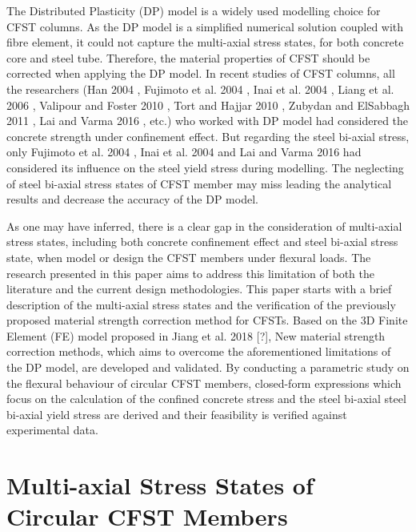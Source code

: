 \documentclass[12pt,a4]{article}
\begin{document}
	\par
	The Distributed Plasticity (DP) model is a widely used modelling choice for CFST columns. As the DP model is a simplified numerical solution coupled with fibre element, it could not capture the multi-axial stress states, for both concrete core and steel tube. Therefore, the material properties of CFST should be corrected when applying the DP model. In recent studies of CFST columns, all the researchers (Han 2004 \cite{RN21}, Fujimoto et al. 2004 \cite{RN15}, Inai et al. 2004 \cite{RN30}, Liang et al. 2006 \cite{RN34}, Valipour and Foster 2010 \cite{RN50}, Tort and Hajjar 2010 \cite{RN46}, Zubydan and ElSabbagh 2011 \cite{RN60}, Lai and Varma 2016 \cite{RN32}, etc.) who worked with DP model had considered the concrete strength under confinement effect. But regarding the steel bi-axial stress, only Fujimoto et al. 2004 \cite{RN15}, Inai et al. 2004 \cite{RN30} and Lai and Varma 2016 \cite{RN32} had considered its influence on the steel yield stress during modelling. The neglecting of steel bi-axial stress states of CFST member may miss leading the analytical results and decrease the accuracy of the DP model. 
	\par
	As one may have inferred, there is a clear gap in the consideration of multi-axial stress states, including both concrete confinement effect and steel bi-axial stress state, when model or design the CFST members under flexural loads. The research presented in this paper aims to address this limitation of both the literature and the current design methodologies. This paper starts with a brief description of the multi-axial stress states and the verification of the previously proposed material strength correction method for CFSTs. Based on the 3D Finite Element (FE) model proposed in Jiang et al. 2018 [?], New material strength correction methods, which aims to overcome the aforementioned limitations of the DP model, are developed and validated. By conducting a parametric study on the flexural behaviour of circular CFST members, closed-form expressions which focus on the calculation of the confined concrete stress and the steel bi-axial steel bi-axial yield stress are derived and their feasibility is verified against experimental data.
	
	\section{Multi-axial Stress States of Circular CFST Members}
\end{document}

